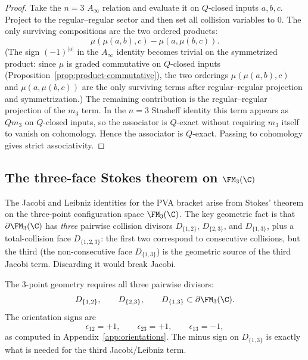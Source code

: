 \begin{proof}
Take the $n=3$ $A_\infty$ relation and evaluate it on $Q$-closed inputs
$a,b,c$. Project to the regular--regular sector and then set all collision variables
to $0$. The only surviving compositions are the two ordered products:
\[
\mu(\mu(a,b),c)-\mu(a,\mu(b,c)).
\]
(The sign $(-1)^{|a|}$ in the $A_\infty$ identity becomes trivial on the
symmetrized product: since $\mu$ is graded commutative on $Q$-closed inputs
(Proposition~\ref{prop:product-commutative}), the two orderings
$\mu(\mu(a,b),c)$ and $\mu(a,\mu(b,c))$ are the only surviving terms after
regular--regular projection and symmetrization.)
The remaining contribution is the regular--regular projection of the
$m_3$ term. In the $n=3$ Stasheff identity this term appears as
$Qm_3$ on $Q$-closed inputs, so the associator is $Q$-exact without
requiring $m_3$ itself to vanish on cohomology.
Hence the associator is $Q$-exact. Passing to cohomology gives strict associativity.
\end{proof}

\subsection{The three-face Stokes theorem on $\FM_3(\C)$}
\label{subsec:three-face-stokes}

The Jacobi and Leibniz identities for the PVA bracket arise from
Stokes' theorem on the three-point configuration space $\FM_3(\C)$.
The key geometric fact is that $\partial\FM_3(\C)$ has \emph{three}
pairwise collision divisors $D_{\{1,2\}}$, $D_{\{2,3\}}$, and
$D_{\{1,3\}}$, plus a total-collision face $D_{\{1,2,3\}}$: the
first two correspond to consecutive collisions, but the third
(the non-consecutive face $D_{\{1,3\}}$) is the geometric
source of the third Jacobi term. Discarding it would break Jacobi.

The $3$-point geometry requires all three pairwise divisors:
\[
D_{\{1,2\}},\qquad D_{\{2,3\}},\qquad D_{\{1,3\}}\subset \partial\FM_3(\C).
\]
The orientation signs are
\[
\epsilon_{12}=+1,\qquad \epsilon_{23}=+1,\qquad \epsilon_{13}=-1,
\]
as computed in Appendix~\ref{app:orientations}. The minus sign on $D_{\{1,3\}}$
is exactly what is needed for the third Jacobi/Leibniz term.

